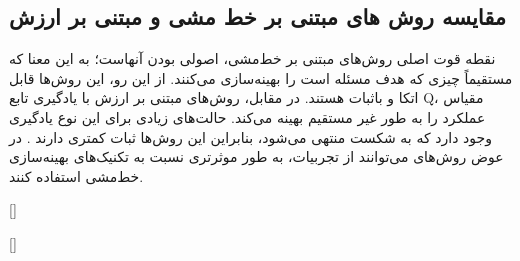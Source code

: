\subsection{مقایسه روش های مبتنی بر خط مشی و مبتنی بر ارزش}
نقطه قوت اصلی روش‌های مبتنی بر خط‌مشی، اصولی بودن آنهاست؛ به این معنا که مستقیماً چیزی که هدف مسئله است را بهینه‌سازی می‌کنند. از این رو، این روش‌ها قابل اتکا و باثبات هستند. در مقابل، روش‌های مبتنی بر ارزش
با یادگیری تابع Q، مقیاس عملکرد را به طور غیر مستقیم بهینه می‌کند. حالت‌های زیادی برای این نوع یادگیری وجود دارد که به شکست منتهی می‌شود، بنابراین این روش‌ها  ثبات کمتری دارند 
\cite{suttonbook}.
در عوض روش‌های 
 می‌توانند از تجربیات، به طور موثرتری نسبت به تکنیک‌های بهینه‌سازی خط‌مشی استفاده کنند.
 
 
 
 []
 
  []



